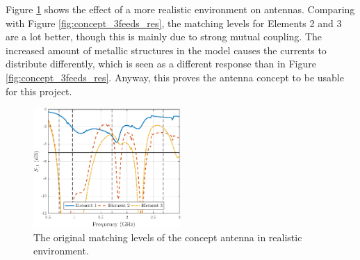 Figure \ref{fig:main_orig} shows the effect of a more realistic environment on antennas. Comparing with Figure \ref{fig:concept_3feeds_res}, the matching levels for Elements 2 and 3 are a lot better, though this is mainly due to strong mutual coupling. The increased amount of metallic structures in the model causes the currents to distribute differently, which is seen as a different response than in Figure \ref{fig:concept_3feeds_res}. Anyway, this proves the antenna concept to be usable for this project.
\begin{figure}[H]
    \centering
    \includegraphics[width=0.5\textwidth]{img/main_orig.eps}
    \vspace{-4pt}
    \caption{The original matching levels of the concept antenna in realistic environment.}
    \label{fig:main_orig}
    \vspace{-10pt}
\end{figure}


